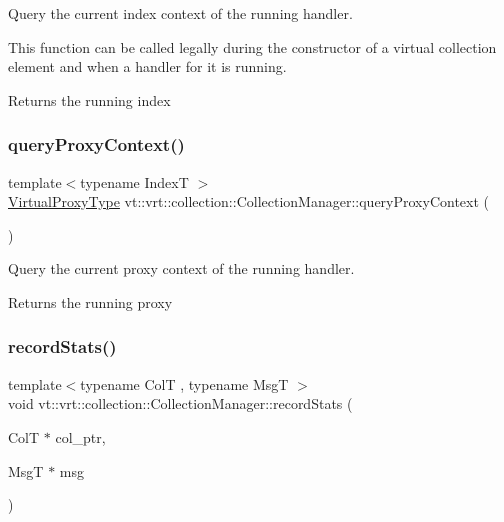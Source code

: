 Query the current index context of the running handler. 

This function can be called legally during the constructor of a virtual collection element and when a handler for it is running.

\begin{DoxyReturn}{Returns}
the running index 
\end{DoxyReturn}
\mbox{\label{structvt_1_1vrt_1_1collection_1_1_collection_manager_a77d8832834659c44badf499c4770777b}} 
\subsubsection{\texorpdfstring{query\+Proxy\+Context()}{queryProxyContext()}}
{\footnotesize\ttfamily template$<$typename IndexT $>$ \\
\hyperlink{namespacevt_a1b417dd5d684f045bb58a0ede70045ac}{Virtual\+Proxy\+Type} vt\+::vrt\+::collection\+::\+Collection\+Manager\+::query\+Proxy\+Context (\begin{DoxyParamCaption}{ }\end{DoxyParamCaption})\hspace{0.3cm}{\ttfamily [static]}}



Query the current proxy context of the running handler. 

\begin{DoxyReturn}{Returns}
the running proxy 
\end{DoxyReturn}
\mbox{\label{structvt_1_1vrt_1_1collection_1_1_collection_manager_a3d49cc2ae24c50443e890e9447d408a9}} 
\subsubsection{\texorpdfstring{record\+Stats()}{recordStats()}}
{\footnotesize\ttfamily template$<$typename ColT , typename MsgT $>$ \\
void vt\+::vrt\+::collection\+::\+Collection\+Manager\+::record\+Stats (\begin{DoxyParamCaption}\item[{ColT $\ast$}]{col\+\_\+ptr,  }\item[{MsgT $\ast$}]{msg }\end{DoxyParamCaption})\hspace{0.3cm}{\ttfamily [static]}}



